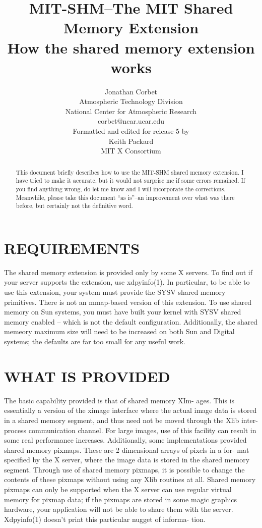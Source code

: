 \documentclass{article}
\title{
	  MIT-SHM--The MIT Shared Memory Extension \\
	   How the shared memory extension works \\
}
\author{Jonathan Corbet\\
	      Atmospheric Technology Division\\
	  National Center for Atmospheric Research\\
		    corbet@ncar.ucar.edu\\
	   Formatted and edited for release 5 by\\
		       Keith Packard\\
		      MIT X Consortium\\
}
\begin{document}
\maketitle
\begin{abstract}
	   This document briefly describes how to use
     the MIT-SHM shared memory extension.  I have tried
     to make it accurate, but it would not surprise me
     if some errors remained.  If you find anything
     wrong, do let me know and I will incorporate the
     corrections.  Meanwhile, please take this document
     ``as is''--an improvement over what was there
     before, but certainly not the definitive word.
\end{abstract}



\section{REQUIREMENTS}
The shared memory extension is provided only by some X
servers.  To find out if your server supports the extension,
use xdpyinfo(1).  In particular, to be able to use this
extension, your system must provide the SYSV shared memory
primitives.  There is not an mmap-based version of this
extension.  To use shared memory on Sun systems, you must
have built your kernel with SYSV shared memory enabled --
which is not the default configuration.	 Additionally, the
shared memeory maximum size will need to be increased on
both Sun and Digital systems; the defaults are far too small
for any useful work.

\section{WHAT IS PROVIDED}
The basic capability provided is that of shared memory XIm-
ages.  This is essentially a version of the ximage interface
where the actual image data is stored in a shared memory
segment, and thus need not be moved through the Xlib inter-
process communication channel.	For large images, use of
this facility can result in some real performance increases.
Additionally, some implementations provided shared memory
pixmaps.  These are 2 dimensional arrays of pixels in a for-
mat specified by the X server, where the image data is
stored in the shared memory segment.  Through use of shared
memory pixmaps, it is possible to change the contents of
these pixmaps without using any Xlib routines at all.
Shared memory pixmaps can only be supported when the X
server can use regular virtual memory for pixmap data; if
the pixmaps are stored in some magic graphics hardware, your
application will not be able to share them with the server.
Xdpyinfo(1) doesn't print this particular nugget of informa-
tion.
\end{document}
